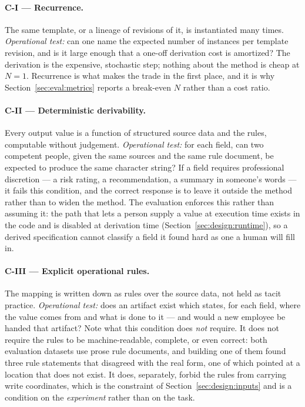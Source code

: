 \paragraph{C-I --- Recurrence.}
The same template, or a lineage of revisions of it, is instantiated many times.
\emph{Operational test:} can one name the expected number of instances per template
revision, and is it large enough that a one-off derivation cost is amortized? The
derivation is the expensive, stochastic step; nothing about the method is cheap at $N=1$.
Recurrence is what makes the trade in the first place, and it is why
Section~\ref{sec:eval:metrics} reports a break-even $N$ rather than a cost ratio.

\paragraph{C-II --- Deterministic derivability.}
Every output value is a function of structured source data and the rules, computable
without judgement. \emph{Operational test:} for each field, can two competent people,
given the same sources and the same rule document, be expected to produce the same
character string? If a field requires professional discretion --- a risk rating, a
recommendation, a summary in someone's words --- it fails this condition, and the correct
response is to leave it outside the method rather than to widen the method. The evaluation
enforces this rather than assuming it: the path that lets a person supply a value at
execution time exists in the code and is disabled at derivation time
(Section~\ref{sec:design:runtime}), so a derived specification cannot classify a field it
found hard as one a human will fill in.

\paragraph{C-III --- Explicit operational rules.}
The mapping is written down as rules over the source data, not held as tacit practice.
\emph{Operational test:} does an artifact exist which states, for each field, where the
value comes from and what is done to it --- and would a new employee be handed that
artifact? Note what this condition does \emph{not} require. It does not require the rules
to be machine-readable, complete, or even correct: both evaluation datasets use prose rule
documents, and building one of them found three rule statements that disagreed with the
real form, one of which pointed at a location that does not exist. It does, separately,
forbid the rules from carrying write coordinates, which is the constraint of
Section~\ref{sec:design:inputs} and is a condition on the \emph{experiment} rather than on
the task.

